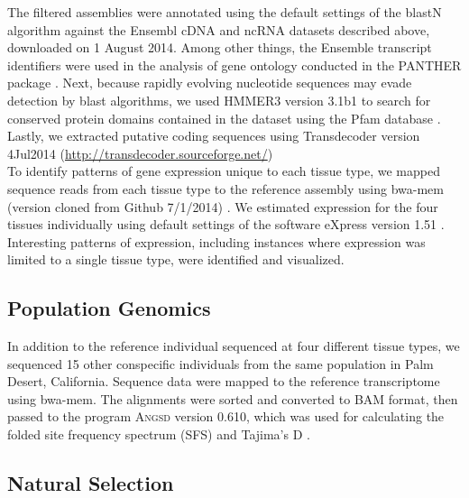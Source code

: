 \documentclass[11pt]{article}
\begin{document}
The filtered assemblies were annotated using the default settings of the blastN algorithm \cite{Camacho:2009fc} against the Ensembl cDNA and ncRNA datasets described above, downloaded on 1 August 2014. Among other things, the Ensemble transcript identifiers were used in the analysis of gene ontology conducted in the PANTHER package \cite{Mi:2004iv}. Next, because rapidly evolving nucleotide sequences may evade detection by blast algorithms, we used HMMER3 version 3.1b1 \cite{Wheeler:2013gj} to search for conserved protein domains contained in the dataset using the Pfam database \cite{Punta:2012ko}. Lastly, we extracted putative coding sequences using Transdecoder version 4Jul2014 (\url{http://transdecoder.sourceforge.net/})\\

To identify patterns of gene expression unique to each tissue type, we mapped sequence reads from each tissue type to the reference assembly using bwa-mem (version cloned from Github 7/1/2014)  \cite{Li:2013wn}. We estimated expression for the four tissues individually using default settings of the software eXpress version 1.51 \cite{Roberts:2012dh}. Interesting patterns of expression, including instances where expression was limited to a single tissue type, were identified and visualized. \\ 

\subsection*{Population Genomics}

In addition to the reference individual sequenced at four different tissue types, we sequenced 15 other conspecific individuals from the same population in Palm Desert, California. Sequence data were mapped to the reference transcriptome using bwa-mem. The alignments were sorted and converted to BAM format, then passed to the program \textsc{Angsd} version 0.610, which was used for calculating the folded site frequency spectrum (SFS) and Tajima's D \cite{Korneliussen:2013uz}. \\


\subsection*{Natural Selection}
\end{document}
